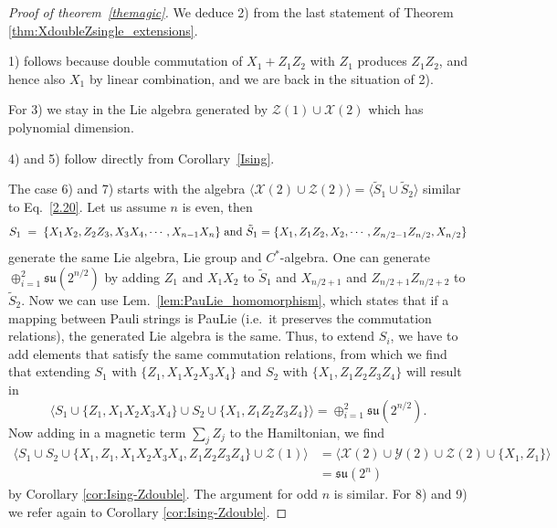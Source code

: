 \documentclass[12pt, a4-paper]{amsart}
\newcommand{\cX}{\mathcal{X}}
\newcommand{\cY}{\mathcal{Y}}
\newcommand{\cZ}{\mathcal{Z}}
\newcommand{\mf}[1]{\mathfrak{#1}}
\numberwithin{equation}{section}
\newcommand{\lel}{\pl = \pl}
\newcommand{\pl}{\hspace{.1cm}}
\begin{document}
\begin{proof}[Proof of theorem~\ref{themagic}] We deduce 2) from the last statement of Theorem \ref{thm:XdoubleZsingle_extensions}. 

1) follows because  double commutation of $X_1+ Z_1 Z_2$ with $Z_1$ produces $Z_1Z_2$, and hence also $X_1$ by linear combination, and we are back in the situation of 2).  

For 3) we  stay in the Lie algebra generated by $\mathcal{Z}(1)\cup \mathcal{X}(2)$ which has polynomial dimension. 

4)  and 5) follow directly from Corollary~\ref{Ising}.

The case 6) and 7) starts with the algebra $\langle \mathcal{X}(2)\cup \mathcal{Z}(2) \rangle = \langle \tilde{S}_1\cup \tilde{S}_2 \rangle $ similar to Eq.~\eqref{2.20}. Let us assume $n$ is even, then 
\[  
    S_1\lel \{X_1X_2,Z_2Z_3,X_3X_4,\cdots  ,X_{n-1}X_n\}\pl \text{and}\pl \tilde{S}_1=\{X_1, Z_1 Z_2, X_2,\cdots, Z_{n/2-1}Z_{n/2}, X_{n/2}\} 
\] 
generate the same Lie algebra, Lie group and $C^*$-algebra. One can generate $\oplus_{i=1}^2\mf{su}(2^{n/2})$ by adding $Z_1$ and $X_1 X_2$ to $\tilde{S}_1$ and $X_{n/2+1}$ and $Z_{n/2+1} Z_{n/2+2}$ to $\tilde{S}_2$. Now we can use Lem.~\ref{lem:PauLie_homomorphism}, which states that if a mapping between Pauli strings is PauLie (i.e.\ it preserves the commutation relations), the generated Lie algebra is the same. Thus, to extend $S_i$, we have to add elements that satisfy the same commutation relations, from which we find that extending $S_1$ with $\{Z_1, X_1X_2X_3X_4\}$ and $S_2$ with $\{X_1, Z_1 Z_2 Z_3 Z_4\}$ will result in
\begin{equation}
    \langle S_1 \cup \{Z_1, X_1 X_2 X_3 X_4\} \cup S_2 \cup \{X_1, Z_1 Z_2 Z_3 Z_4\} \rangle = \oplus_{i=1}^2 \mf{su}(2^{n/2}).
\end{equation}
Now adding in a magnetic term $\sum_j Z_j$ to the Hamiltonian, we find 
\begin{align*}
    \langle S_1 \cup S_2 \cup \{X_1, Z_1, X_1 X_2 X_3 X_4, Z_1 Z_2 Z_3 Z_4\} \cup \cZ(1) \rangle &= \langle \cX(2) \cup \cY(2) \cup \cZ(2) \cup \{X_1, Z_1\} \rangle \\
    &=  \mf{su}(2^n)
\end{align*}
by Corollary \ref{cor:Ising-Zdouble}. The argument for odd $n$ is similar.
For 8) and 9) we refer again to Corollary \ref{cor:Ising-Zdouble}. 
\end{proof} 
\end{document}
